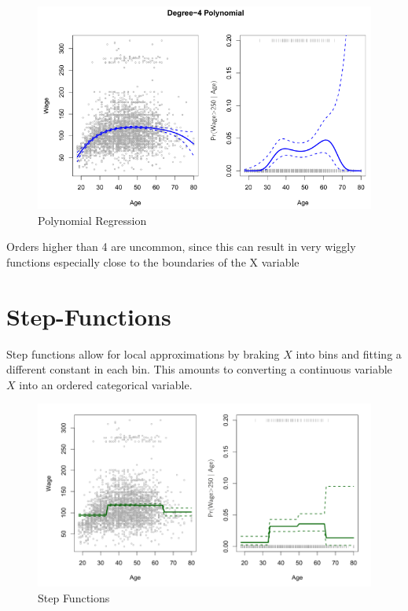 \documentclass[../Main.tex]{subfiles}
\begin{document}
\begin{figure}[H]
    \centering
    \includegraphics[width=0.75\linewidth]{Images/polynomial-regression.png}
    \caption{Polynomial Regression}
\end{figure}

Orders higher than 4 are 
uncommon, since this can result in very 
wiggly functions especially close to the 
boundaries of the X variable

\section{Step-Functions}
Step functions allow for local approximations by 
braking \(X\) into bins and fitting a different constant in each bin.
This amounts to converting a continuous 
variable \(X\) into an ordered categorical variable.

\begin{figure}[H]
    \centering
    \includegraphics[width=0.75\linewidth]{Images/step-functions.png}
    \caption{Step Functions}
\end{figure}
\end{document}
